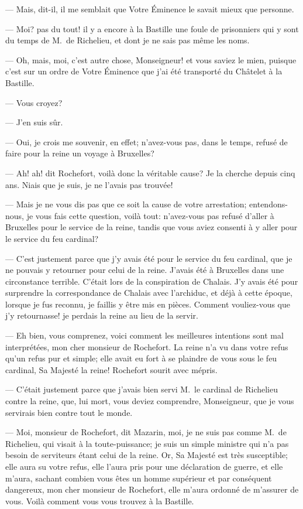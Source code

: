 — Mais, dit-il, il me semblait que Votre Éminence le savait mieux que personne.

— Moi? pas du tout! il y a encore à la Bastille une foule de prisonniers qui y sont du temps de M.~de Richelieu, et dont je ne sais pas même les noms.

— Oh, mais, moi, c'est autre chose, Monseigneur! et vous saviez le mien, puisque c'est sur un ordre de Votre Éminence que j'ai été transporté du Châtelet à la Bastille.

— Vous croyez?

— J'en suis sûr.

— Oui, je crois me souvenir, en effet; n'avez-vous pas, dans le temps, refusé de faire pour la reine un voyage à Bruxelles?

— Ah! ah! dit Rochefort, voilà donc la véritable cause? Je la cherche depuis cinq ans. Niais que je suis, je ne l'avais pas trouvée!

— Mais je ne vous dis pas que ce soit la cause de votre arrestation; entendons-nous, je vous fais cette question, voilà tout: n'avez-vous pas refusé d'aller à Bruxelles pour le service de la reine, tandis que vous aviez consenti à y aller pour le service du feu cardinal?

— C'est justement parce que j'y avais été pour le service du feu cardinal, que je ne pouvais y retourner pour celui de la reine. J'avais été à Bruxelles dans une circonstance terrible. C'était lors de la conspiration de Chalais. J'y avais été pour surprendre la correspondance de Chalais avec l'archiduc, et déjà à cette époque, lorsque je fus reconnu, je faillis y être mis en pièces. Comment vouliez-vous que j'y retournasse! je perdais la reine au lieu de la servir.

— Eh bien, vous comprenez, voici comment les meilleures intentions sont mal interprétées, mon cher monsieur de Rochefort. La reine n'a vu dans votre refus qu'un refus pur et simple; elle avait eu fort à se plaindre de vous sous le feu cardinal, Sa Majesté la reine! Rochefort sourit avec mépris.

— C'était justement parce que j'avais bien servi M.~le cardinal de Richelieu contre la reine, que, lui mort, vous deviez comprendre, Monseigneur, que je vous servirais bien contre tout le monde.

— Moi, monsieur de Rochefort, dit Mazarin, moi, je ne suis pas comme M.~de Richelieu, qui visait à la toute-puissance; je suis un simple ministre qui n'a pas besoin de serviteurs étant celui de la reine. Or, Sa Majesté est très susceptible; elle aura su votre refus, elle l'aura pris pour une déclaration de guerre, et elle m'aura, sachant combien vous êtes un homme supérieur et par conséquent dangereux, mon cher monsieur de Rochefort, elle m'aura ordonné de m'assurer de vous. Voilà comment vous vous trouvez à la Bastille.


